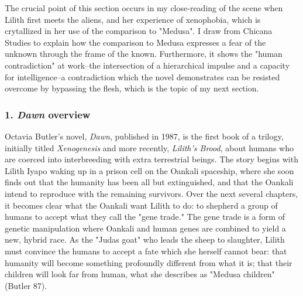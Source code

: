\documentclass[11pt]{article}
\begin{document}
The crucial point of this section occurs in my close-reading of the
scene when Lilith first meets the aliens, and her experience of
xenophobia, which is crytallized in her use of the comparison to
"Medusa". I draw from Chicana Studies to explain how the comparison to
Medusa expresses a fear of the unknown through the frame of the
known. Furthermore, it shows the "human contradiction" at work--the
intersection of a hierarchical impulse and a capacity for
intelligence--a contradiction which the novel demonstrates can be
resisted overcome by bypassing the flesh, which is the topic of my
next section.

\subsubsection{1. \emph{Dawn} overview}
\label{sec:orgee152d1}
Octavia Butler's novel, \emph{Dawn}, published in 1987, is the first book
of a trilogy, initially titled \emph{Xenogenesis} and more recently,
\emph{Lilith's Brood}, about humans who are coerced into interbreeding with
extra terrestrial beings. The story begins with Lilith Iyapo waking up
in a prison cell on the Oankali spaceship, where she soon finds out
that the humanity has been all but extinguished, and that the Oankali
intend to reproduce with the remaining survivors. Over the next
several chapters, it becomes clear what the Oankali want Lilith to do:
to shepherd a group of humans to accept what they call the "gene
trade." The gene trade is a form of genetic manipulation where Oankali
and human genes are combined to yield a new, hybrid race. As the
"Judas goat" who leads the sheep to slaughter, Lilith must convince
the humans to accept a fate which she herself cannot bear: that
humanity will become something profoundly different from what it is;
that their children will look far from human, what she describes as
"Medusa children" (Butler 87).
\end{document}
